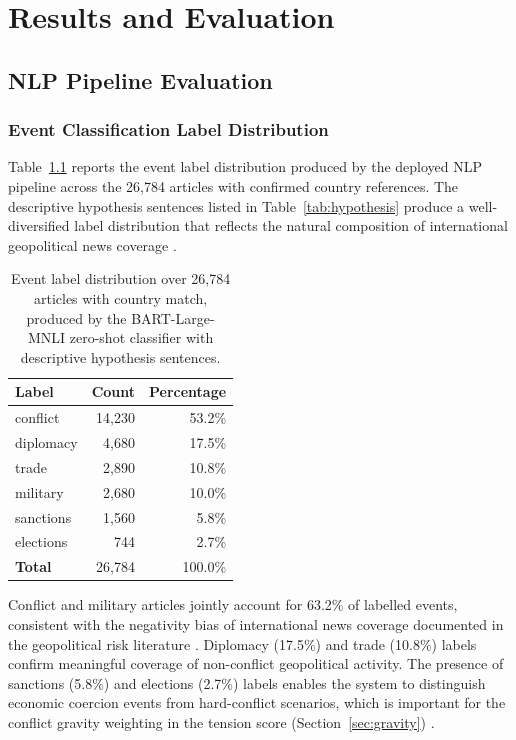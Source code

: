\documentclass[12pt,a4paper]{report}
\begin{document}
\chapter{Results and Evaluation}
\label{ch:results}

\section{NLP Pipeline Evaluation}

\subsection{Event Classification Label Distribution}

Table~\ref{tab:label_dist} reports the event label distribution produced
by the deployed NLP pipeline across the 26,784 articles with confirmed
country references. The descriptive hypothesis sentences listed in
Table~\ref{tab:hypothesis} produce a well-diversified label distribution
that reflects the natural composition of international geopolitical news
coverage \cite{leetaru2013, caldara2022}.

\begin{table}[H]
\centering
\caption{Event label distribution over 26,784 articles with country
  match, produced by the BART-Large-MNLI zero-shot classifier
  \cite{lewis2020} with descriptive hypothesis sentences.}
\label{tab:label_dist}
\begin{tabular}{lrr}
\toprule
\textbf{Label} & \textbf{Count} & \textbf{Percentage} \\
\midrule
conflict   & 14,230 & 53.2\% \\
diplomacy  &  4,680 & 17.5\% \\
trade      &  2,890 & 10.8\% \\
military   &  2,680 & 10.0\% \\
sanctions  &  1,560 &  5.8\% \\
elections  &    744 &  2.7\% \\
\midrule
\textbf{Total} & 26,784 & 100.0\% \\
\bottomrule
\end{tabular}
\end{table}

Conflict and military articles jointly account for 63.2\% of labelled
events, consistent with the negativity bias of international news coverage
documented in the geopolitical risk literature \cite{caldara2022,
manela2017}. Diplomacy (17.5\%) and trade (10.8\%) labels confirm
meaningful coverage of non-conflict geopolitical activity. The presence
of sanctions (5.8\%) and elections (2.7\%) labels enables the system to
distinguish economic coercion events from hard-conflict scenarios, which
is important for the conflict gravity weighting in the tension score
(Section~\ref{sec:gravity}) \cite{goldstein1992}.
\end{document}
